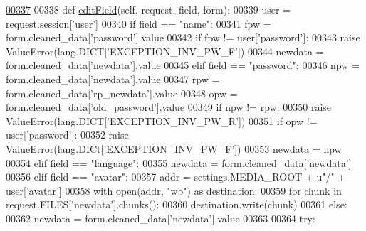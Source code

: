 \begin{DoxyCode}
\hypertarget{classProfile_1_1ProfileUnit_1_1BusProfile_l00337}{}\hyperlink{classProfile_1_1ProfileUnit_1_1BusProfile_a5c116d007081ffefcc1c45cd34c88e10}{00337} 
00338     \textcolor{keyword}{def }\hyperlink{classProfile_1_1ProfileUnit_1_1BusProfile_a5c116d007081ffefcc1c45cd34c88e10}{editField}(self, request, field, form):
00339         user = request.session[\textcolor{stringliteral}{'user'}]
00340         \textcolor{keywordflow}{if} field == \textcolor{stringliteral}{"name"}:
00341             fpw = form.cleaned\_data[\textcolor{stringliteral}{'password'}].value
00342             \textcolor{keywordflow}{if} fpw != user[\textcolor{stringliteral}{'password'}]:
00343                 \textcolor{keywordflow}{raise} ValueError(lang.DICT[\textcolor{stringliteral}{'EXCEPTION\_INV\_PW\_F'}])
00344             newdata = form.cleaned\_data[\textcolor{stringliteral}{'newdata'}].value
00345         \textcolor{keywordflow}{elif} field == \textcolor{stringliteral}{"password"}:
00346             npw = form.cleaned\_data[\textcolor{stringliteral}{'newdata'}].value
00347             rpw = form.cleaned\_data[\textcolor{stringliteral}{'rp\_newdata'}].value
00348             opw = form.cleaned\_data[\textcolor{stringliteral}{'old\_password'}].value
00349             \textcolor{keywordflow}{if} npw != rpw:
00350                 \textcolor{keywordflow}{raise} ValueError(lang.DICT[\textcolor{stringliteral}{'EXCEPTION\_INV\_PW\_R'}])
00351             \textcolor{keywordflow}{if} opw != user[\textcolor{stringliteral}{'password'}]:
00352                 \textcolor{keywordflow}{raise} ValueError(lang.DICt[\textcolor{stringliteral}{'EXCEPTION\_INV\_PW\_F'}])
00353             newdata = npw
00354         \textcolor{keywordflow}{elif} field == \textcolor{stringliteral}{"language"}:
00355             newdata = form.cleaned\_data[\textcolor{stringliteral}{'newdata'}]
00356         \textcolor{keywordflow}{elif} field == \textcolor{stringliteral}{"avatar"}:
00357             addr = settings.MEDIA\_ROOT + \textcolor{stringliteral}{u"/"} + user[\textcolor{stringliteral}{'avatar'}]
00358             with open(addr, \textcolor{stringliteral}{"wb"}) \textcolor{keyword}{as} destination:
00359                     \textcolor{keywordflow}{for} chunk \textcolor{keywordflow}{in} request.FILES[\textcolor{stringliteral}{'newdata'}].chunks():
00360                         destination.write(chunk)
00361         \textcolor{keywordflow}{else}:
00362             newdata = form.cleaned\_data[\textcolor{stringliteral}{'newdata'}].value
00363 
00364         \textcolor{keywordflow}{try}:

\end{DoxyCode}
